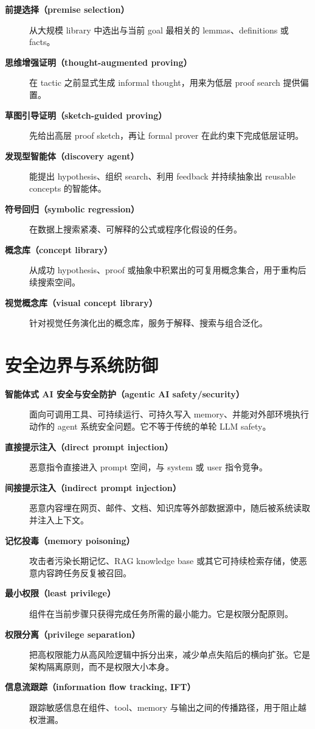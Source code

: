 \begin{description}
\item[\textbf{前提选择（premise selection）}] 从大规模 library 中选出与当前 goal 最相关的 lemmas、definitions 或 facts。

\item[\textbf{思维增强证明（thought-augmented proving）}] 在 tactic 之前显式生成 informal thought，用来为低层 proof search 提供偏置。

\item[\textbf{草图引导证明（sketch-guided proving）}] 先给出高层 proof sketch，再让 formal prover 在此约束下完成低层证明。

\item[\textbf{发现型智能体（discovery agent）}] 能提出 hypothesis、组织 search、利用 feedback 并持续抽象出 reusable concepts 的智能体。

\item[\textbf{符号回归（symbolic regression）}] 在数据上搜索紧凑、可解释的公式或程序化假设的任务。

\item[\textbf{概念库（concept library）}] 从成功 hypothesis、proof 或抽象中积累出的可复用概念集合，用于重构后续搜索空间。

\item[\textbf{视觉概念库（visual concept library）}] 针对视觉任务演化出的概念库，服务于解释、搜索与组合泛化。
\end{description}

\section{安全边界与系统防御}

\begin{description}
\item[\textbf{智能体式 AI 安全与安全防护（agentic AI safety/security）}] 面向可调用工具、可持续运行、可持久写入 memory、并能对外部环境执行动作的 agent 系统安全问题。它不等于传统的单轮 LLM safety。

\item[\textbf{直接提示注入（direct prompt injection）}] 恶意指令直接进入 prompt 空间，与 system 或 user 指令竞争。

\item[\textbf{间接提示注入（indirect prompt injection）}] 恶意内容埋在网页、邮件、文档、知识库等外部数据源中，随后被系统读取并注入上下文。

\item[\textbf{记忆投毒（memory poisoning）}] 攻击者污染长期记忆、RAG knowledge base 或其它可持续检索存储，使恶意内容跨任务反复被召回。

\item[\textbf{最小权限（least privilege）}] 组件在当前步骤只获得完成任务所需的最小能力。它是权限分配原则。

\item[\textbf{权限分离（privilege separation）}] 把高权限能力从高风险逻辑中拆分出来，减少单点失陷后的横向扩张。它是架构隔离原则，而不是权限大小本身。

\item[\textbf{信息流跟踪（information flow tracking, IFT）}] 跟踪敏感信息在组件、tool、memory 与输出之间的传播路径，用于阻止越权泄漏。
\end{description}

